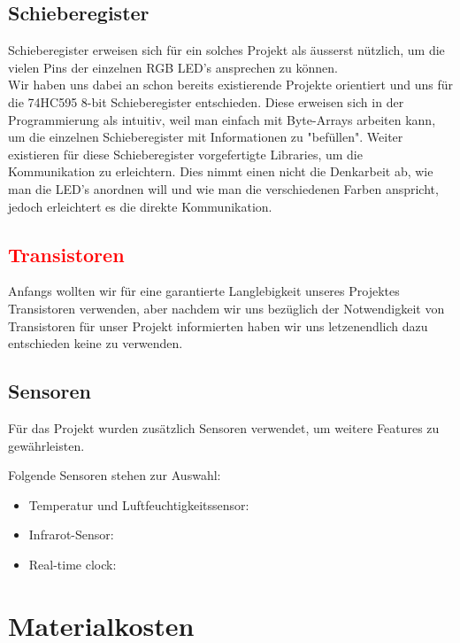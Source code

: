 \documentclass[12pt,a4paper]{article}
\begin{document}
\subsection{Schieberegister}

Schieberegister erweisen sich für ein solches Projekt als äusserst nützlich, um die vielen Pins der einzelnen RGB LED's ansprechen zu können. \\

Wir haben uns dabei an schon bereits existierende Projekte orientiert und uns für die 74HC595 8-bit Schieberegister entschieden. Diese erweisen sich in der Programmierung als intuitiv, weil man einfach mit Byte-Arrays arbeiten kann, um die einzelnen Schieberegister mit Informationen zu "befüllen". Weiter existieren für diese Schieberegister vorgefertigte Libraries, um die Kommunikation zu erleichtern. Dies nimmt einen nicht die Denkarbeit ab, wie man die LED's anordnen will und wie man die verschiedenen Farben anspricht, jedoch erleichtert es die direkte Kommunikation.

\subsection{\textcolor{red}{Transistoren}}

Anfangs wollten wir für eine garantierte Langlebigkeit unseres Projektes Transistoren verwenden, aber nachdem wir uns bezüglich der Notwendigkeit
von Transistoren für unser Projekt informierten haben wir uns letzenendlich dazu entschieden keine zu verwenden.

\subsection{Sensoren}

Für das Projekt wurden zusätzlich Sensoren verwendet, um weitere Features zu gewährleisten.

Folgende Sensoren stehen zur Auswahl:
\begin{itemize}
    \item Temperatur und Luftfeuchtigkeitssensor:
    \item Infrarot-Sensor:
    \item Real-time clock:
\end{itemize}

\section{Materialkosten}
\end{document}
